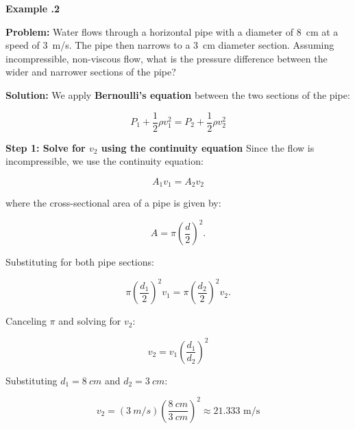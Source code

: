 	\begin{mdframed}[backgroundcolor=blue!10!white]
	\begin{center}
		
		
		\textbf{Example \thesection.2}	
	\end{center}
	
	\textbf{Problem:}  
	Water flows through a horizontal pipe with a diameter of \SI{8}{cm} at a speed of \SI{3}{m/s}. The pipe then narrows to a \SI{3}{cm} diameter section. Assuming incompressible, non-viscous flow, what is the pressure difference between the wider and narrower sections of the pipe?
	
	\vspace{0.2in}
	
	\textbf{Solution:}  
	We apply \textbf{Bernoulli’s equation} between the two sections of the pipe:
	
	\begin{equation*}
		P_1 + \frac{1}{2} \rho v_1^2 = P_2 + \frac{1}{2} \rho v_2^2
	\end{equation*}
	
	\textbf{Step 1: Solve for \( v_2 \) using the continuity equation}  
	Since the flow is incompressible, we use the continuity equation:
	
	\begin{equation*}
		A_1 v_1 = A_2 v_2
	\end{equation*}
	
	where the cross-sectional area of a pipe is given by:
	
	\begin{equation*}
		A = \pi \left(\frac{d}{2} \right)^2.
	\end{equation*}
	
	Substituting for both pipe sections:
	
	\begin{equation*}
		\pi \left(\frac{d_1}{2} \right)^2 v_1 = \pi \left(\frac{d_2}{2} \right)^2 v_2.
	\end{equation*}
	
	Canceling \( \pi \) and solving for \( v_2 \):
	
	\begin{equation*}
		v_2 = v_1 \left( \frac{d_1}{d_2} \right)^2
	\end{equation*}
	
	Substituting \( d_1 = \SI{8}{cm} \) and \( d_2 = \SI{3}{cm} \):
	
	\begin{equation*}
		v_2 = (\SI{3}{m/s}) \left( \frac{\SI{8}{cm}}{\SI{3}{cm}} \right)^2  \approx 21.333 \text{ m/s}
	\end{equation*}
	


\end{mdframed}
